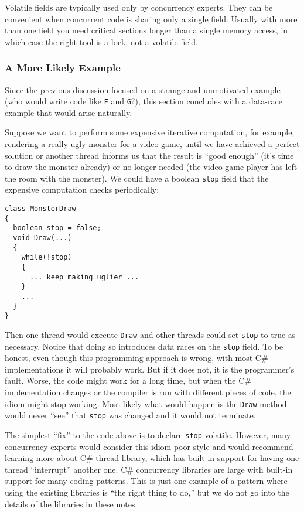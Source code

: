 \documentclass[10pt]{article}
\begin{document}
Volatile fields are typically used only by concurrency experts.  They
can be convenient when concurrent code is sharing only a single
field.  Usually with more than one field you need critical sections
longer than a single memory access, in which case the right tool is a
lock, not a volatile field.

\subsubsection{A More Likely Example}

Since the previous discussion focused on a strange and unmotivated
example (who would write code like {\tt F} and {\tt G}?), this section
concludes with a data-race example that would arise naturally.

Suppose we want to perform some expensive iterative computation, for
example, rendering a really ugly monster for a video game, until we
have achieved a perfect solution or another thread informs us that the
result is ``good enough'' (it's time to draw the monster already) or
no longer needed (the video-game player has left the room with the
monster).  We could have a boolean {\tt stop} field that the expensive
computation checks periodically:
\begin{verbatim}
class MonsterDraw
{
  boolean stop = false;
  void Draw(...)
  {
    while(!stop)
    {
      ... keep making uglier ...
    }
    ...
  }
}
\end{verbatim}
Then one thread would execute {\tt Draw} and other threads could set
{\tt stop} to true as necessary.  Notice that doing so introduces data
races on the {\tt stop} field.  To be honest, even though this
programming approach is wrong, with most C\# implementations it will
probably work.  But if it does not, it is the programmer's fault.
Worse, the code might work for a long time, but when the C\#
implementation changes or the compiler is run with different pieces of
code, the idiom might stop working.  Most likely what would happen is
the {\tt Draw} method would never ``see'' that {\tt stop} was changed
and it would not terminate.

The simplest ``fix'' to the code above is to declare {\tt stop}
volatile.  However, many concurrency experts would consider this idiom
poor style and would recommend learning more about C\# thread
library, which has built-in support for having one thread
``interrupt'' another one.  C\# concurrency libraries are large
with built-in support for many coding patterns.  This is just one
example of a pattern where using the existing libraries is ``the right
thing to do,'' but we do not go into the details of the libraries in
these notes.
\end{document}
